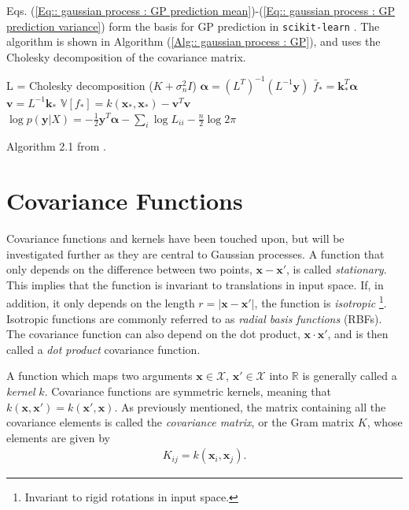 \documentclass[twoside,english]{uiofysmaster}
\begin{document}
Eqs. (\ref{Eq:: gaussian process : GP prediction mean})-(\ref{Eq:: gaussian process : GP prediction variance}) form the basis for GP prediction in \verb|scikit-learn|  \cite{scikit-learn}. The algorithm is shown in Algorithm (\ref{Alg:: gaussian process : GP}), and uses the Cholesky decomposition of the covariance matrix.

\begin{algorithm}
L = Cholesky decomposition ($K + \sigma_n^2 I$) \;
$\boldsymbol{\alpha} = (L^T)^{-1}(L^{-1} \textbf{y})$ \;
$\bar{f}_* = \textbf{k}_*^T \boldsymbol{\alpha}$ \;
$\textbf{v} = L^{-1} \textbf{k}_*$ \;
$\mathbb{V}[f_*] = k(\textbf{x}_*, \textbf{x}_*) - \textbf{v}^T \textbf{v}$ \;
$\log p(\textbf{y}|X) = - \frac{1}{2} \textbf{y}^T \boldsymbol{\alpha} - \sum_i \log L_{ii} - \frac{n}{2} \log 2 \pi$ \;
\caption{Algorithm 2.1 from \cite{rasmussen2006gaussian}.}
\label{Alg:: gaussian process : GP}
\end{algorithm}

\section{Covariance Functions}
Covariance functions and kernels have been touched upon, but will be investigated further as they are central to Gaussian processes. A function that only depends on the difference between two points, $\textbf{x} - \textbf{x}'$, is called \textit{stationary}. This implies that the function is invariant to translations in input space. If, in addition, it only depends on the length $r=|\textbf{x}-\textbf{x}'|$, the function is \textit{isotropic} \footnote{Invariant to rigid rotations in input space.}.  Isotropic functions are commonly referred to as \textit{radial basis functions} (RBFs). The covariance function can also depend on the dot product, $\textbf{x} \cdot \textbf{x}'$, and is then called a \textit{dot product} covariance function.

A function which maps two arguments $\textbf{x} \in \mathcal{X}$, $\textbf{x}' \in \mathcal{X}$ into $\mathbb{R}$ is generally called a \textit{kernel} $k$. Covariance functions are symmetric kernels, meaning that $k(\textbf{x}, \textbf{x}') = k(\textbf{x}', \textbf{x})$. As previously mentioned, the matrix containing all the covariance elements is called the \textit{covariance matrix}, or the Gram matrix $K$, whose elements are given by
\begin{align}\label{Eq:: covariance matrix}
K_{ij} = k(\textbf{x}_i, \textbf{x}_j).
\end{align}
\end{document}
